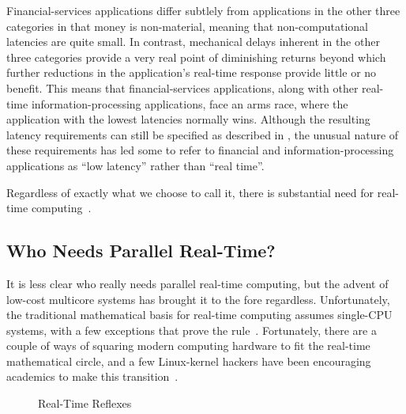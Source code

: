 Financial-services applications differ subtlely from applications in
the other three categories in that money is non-material, meaning that
non-computational latencies are quite small.
In contrast, mechanical delays inherent in the other three categories
provide a very real point of diminishing returns beyond which further
reductions in the application's real-time response provide little or
no benefit.
This means that financial-services applications, along with other
real-time information-processing applications, face an arms race,
where the application with the lowest latencies normally wins.
Although the resulting latency requirements can still be specified
as described in
,
the unusual nature of these requirements has led some to refer to
financial and information-processing applications as ``low latency''
rather than ``real time''.

Regardless of exactly what we choose to call it, there is substantial
need for real-time
computing~\cite{JeremyWPeters2006NYTDec11,BillInmon2007a}.

\subsection{Who Needs Parallel Real-Time?}
\label{sec:advsync:Who Needs Parallel Real-Time?}

It is less clear who really needs parallel real-time computing, but
the advent of low-cost multicore systems has brought it to the fore
regardless.
Unfortunately, the traditional mathematical basis for real-time
computing assumes single-CPU systems, with a few exceptions that
prove the rule~\cite{BjoernBrandenburgPhD}.
Fortunately, there are a couple of ways of squaring modern computing
hardware to fit the real-time mathematical circle, and a few Linux-kernel
hackers have been encouraging academics to make this
transition~\cite{DanielBristot2019RTtrace,ThomasGleixner2010AcademiaVsReality}.

\begin{figure}
\centering
{}
\caption{Real-Time Reflexes}
\label{fig:advsync:Real-Time Reflexes}
\end{figure}

